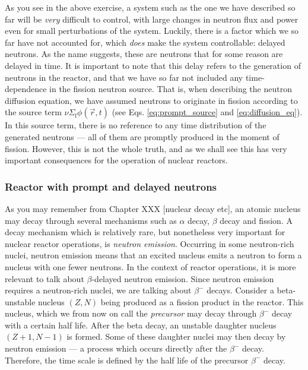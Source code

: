 As you see in the above exercise, a system such as the one we have described so far will be \emph{very} difficult to control, with large changes in neutron flux and power even for small perturbations of the system. Luckily, there is a factor which we so far have not accounted for, which \emph{does} make the system controllable: delayed neutrons. As the name suggests, these are neutrons that for some reason are delayed in time. It is important to note that this delay refers to the generation of neutrons in the reactor, and that we have so far not included any time-dependence in the fission neutron source. That is, when describing the neutron diffusion equation, we have assumed neutrons to originate in fission according to the source term $\nu \Sigma_\text{f}\phi(\vec{r}, t)$ (see Eqs. \ref{eq:prompt_source} and \ref{eq:diffusion_eq}). In this source term, there is no reference to any time distribution of the generated neutrons --- all of them are promptly produced in the moment of fission. However, this is not the whole truth, and as we shall see this has very important consequences for the operation of nuclear reactors.

\subsubsection{Reactor with prompt and delayed neutrons}
As you may remember from Chapter XXX [nuclear decay etc], an atomic nucleus may decay through several mechanisms such as $\alpha$ decay, $\beta$ decay and fission. A decay mechanism which is relatively rare, but nonetheless very important for nuclear reactor operations, is \emph{neutron emission}. Occurring in some neutron-rich nuclei, neutron emission means that an excited nucleus emits a neutron to form a nucleus with one fewer neutrons. In the context of reactor operations, it is more relevant to talk about $\beta$-delayed neutron emission. Since neutron emission requires a neutron-rich nuclei, we are talking about $\beta^-$ decays. Consider a beta-unstable nucleus $(Z, N)$ being produced as a fission product in the reactor. This nucleus, which we from now on call the \emph{precursor} may decay through $\beta^-$ decay with a certain half life. After the beta decay, an unstable daughter nucleus $(Z+1, N-1)$ is formed. Some of these daughter nuclei may then decay by neutron emission --- a process which occurs directly after the $\beta^-$ decay. Therefore, the time scale is defined by the half life of the precursor $\beta^-$ decay.

